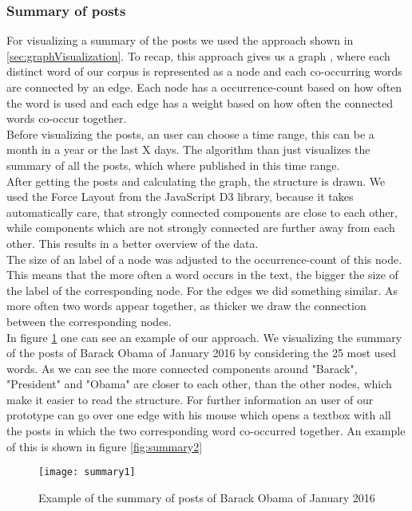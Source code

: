 \subsubsection{Summary of posts}
For visualizing a summary of the posts we used the approach shown in \ref{sec:graphVisualization}. To recap, this approach gives us a graph , where each distinct word of our corpus is represented as  a node and each co-occurring words are connected by an edge. Each node has a occurrence-count based on how often the word is used and each edge has a weight based on how often the connected words co-occur together. \\
Before visualizing the posts, an user can choose a time range, this can be a month in a year or the last X days. The algorithm than just visualizes the summary of all the posts, which where published in this time range. \\
After getting the posts and calculating the graph, the structure is drawn. We used the Force Layout from the JavaScript D3 library, because it  takes automatically care, that strongly connected components are close to each other, while components which are not strongly connected are further away from each other. This results in a better overview of the data. \\
The size of an label of a node was adjusted to the occurrence-count of this node. This means that the more often a word occurs in the text, the bigger the size of the label of the corresponding node. For the edges we did something similar. As more often two words appear together, as thicker we draw the connection between the corresponding nodes. \\
In  figure \ref{fig:summary} one can see an example of our approach. We visualizing the summary of the posts of Barack Obama of January 2016 by considering the 25 most used words. As we can see the more connected components around "Barack", "President" and "Obama" are closer to each other, than the other nodes, which make it easier to read the structure. For further information an user of our prototype can go over one edge with his mouse which opens a textbox with all the posts in which the two corresponding word co-occurred together. An example of this is shown in figure \ref{fig:summary2} 

\begin{figure}[t]
	\centering
	\texttt{[image: summary1]}
	\caption[ContributonOverTime]{Example of the summary of posts of Barack Obama of January 2016}
	\label{fig:summary}
\end{figure}


